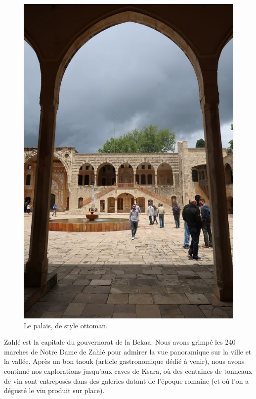 \begin{figure}
\centering
\includegraphics{images/20180517_beiteddine.jpg}
\caption{Le palais, de style ottoman.}
\end{figure}

Zahlé est la capitale du gouvernorat de la Bekaa. Nous avons grimpé les
240 marches de Notre Dame de Zahlé pour admirer la vue panoramique sur
la ville et la vallée. Après un bon taouk (article gastronomique dédié à
venir), nous avons continué nos explorations jusqu'aux caves de Ksara,
où des centaines de tonneaux de vin sont entreposés dans des galeries
datant de l'époque romaine (et où l'on a dégusté le vin produit sur
place).


